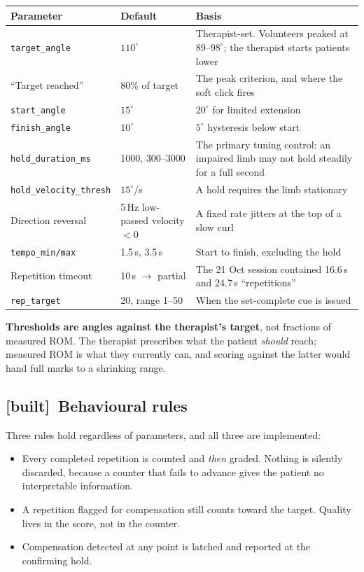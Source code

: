 \documentclass[11pt]{article}
\newcommand{\built}{{\sffamily\scriptsize\color{good}\textbf{[built]}}\ }
\begin{document}
\begin{table}[H]
\centering\small
\begin{tabularx}{\linewidth}{@{}p{38mm} p{25mm} X@{}}
\toprule
\textbf{Parameter} & \textbf{Default} & \textbf{Basis} \\
\midrule
\texttt{target\_angle} & $110^{\circ}$ & Therapist-set. Volunteers peaked at $89$--$98^{\circ}$; the therapist starts patients lower \\
``Target reached'' & 80\% of target & The peak criterion, and where the soft click fires \\
\texttt{start\_angle} & $15^{\circ}$ & $20^{\circ}$ for limited extension \\
\texttt{finish\_angle} & $10^{\circ}$ & $5^{\circ}$ hysteresis below start \\
\texttt{hold\_duration\_ms} & 1000, 300--3000 & The primary tuning control: an impaired limb may not hold steadily for a full second \\
\texttt{hold\_velocity\_thresh} & $15^{\circ}/$s & A hold requires the limb stationary \\
Direction reversal & 5\,Hz low-passed velocity $<0$ & A fixed rate jitters at the top of a slow curl \\
\texttt{tempo\_min/max} & 1.5\,s, 3.5\,s & Start to finish, excluding the hold \\
Repetition timeout & 10\,s $\rightarrow$ partial & The 21 Oct session contained 16.6\,s and 24.7\,s ``repetitions'' \\
\texttt{rep\_target} & 20, range 1--50 & When the set-complete cue is issued \\
\bottomrule
\end{tabularx}
\end{table}

\noindent
\textbf{Thresholds are angles against the therapist's target}, not fractions
of measured ROM. The therapist prescribes what the patient \emph{should}
reach; measured ROM is what they currently can, and scoring against the latter
would hand full marks to a shrinking range.

\subsection{\built Behavioural rules}

Three rules hold regardless of parameters, and all three are implemented:

\begin{itemize}
\item Every completed repetition is counted and \emph{then} graded. Nothing is
silently discarded, because a counter that fails to advance gives the patient
no interpretable information.
\item A repetition flagged for compensation still counts toward the target.
Quality lives in the score, not in the counter.
\item Compensation detected at any point is latched and reported at the
confirming hold.
\end{itemize}
\end{document}
